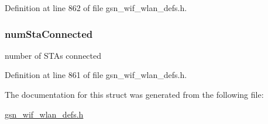 Definition at line 862 of file gsn\_\-wif\_\-wlan\_\-defs.h.

\hypertarget{a00375_a2547404f8dfae54bf7a79a5852a2eb4d}{
\subsubsection[{numStaConnected}]{ {\bf numStaConnected}}}
\label{a00375_a2547404f8dfae54bf7a79a5852a2eb4d}
number of STAs connected 

Definition at line 861 of file gsn\_\-wif\_\-wlan\_\-defs.h.



The documentation for this struct was generated from the following file:\begin{DoxyCompactItemize}
\item 
\hyperlink{a00613}{gsn\_\-wif\_\-wlan\_\-defs.h}\end{DoxyCompactItemize}
